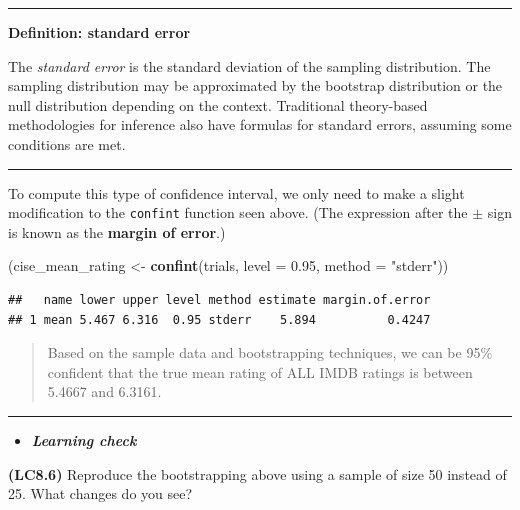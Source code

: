\documentclass[]{tufte-book}
\newenvironment{Shaded}{\begin{snugshade}}{\end{snugshade}}
\newcommand{\KeywordTok}[1]{\textcolor[rgb]{0.13,0.29,0.53}{\textbf{{#1}}}}
\newcommand{\DataTypeTok}[1]{\textcolor[rgb]{0.13,0.29,0.53}{{#1}}}
\newcommand{\FloatTok}[1]{\textcolor[rgb]{0.00,0.00,0.81}{{#1}}}
\newcommand{\StringTok}[1]{\textcolor[rgb]{0.31,0.60,0.02}{{#1}}}
\newcommand{\NormalTok}[1]{{#1}}
\let\oldrule=\rule
\renewcommand{\rule}[1]{\oldrule{\linewidth}}
\newenvironment{rmdblock}[1]
  {\begin{shaded*}
  \begin{itemize}
  \renewcommand{\labelitemi}{
    \raisebox{-.7\height}[0pt][0pt]{
    }
  }
  \item
  }
  {
  \end{itemize}
  \end{shaded*}
  }
\newenvironment{learncheck}
  {\begin{rmdblock}{warning}}
  {\end{rmdblock}}
\theoremstyle{definition}
\theoremstyle{definition}
\theoremstyle{remark}
\begin{document}
\begin{center}\rule{0.5\linewidth}{\linethickness}\end{center}

\textbf{Definition: standard error}

The \emph{standard error} is the standard deviation of the sampling
distribution. The sampling distribution may be approximated by the
bootstrap distribution or the null distribution depending on the
context. Traditional theory-based methodologies for inference also have
formulas for standard errors, assuming some conditions are met.

\begin{center}\rule{0.5\linewidth}{\linethickness}\end{center}

To compute this type of confidence interval, we only need to make a
slight modification to the \texttt{confint} function seen above. (The
expression after the \(\pm\) sign is known as the \textbf{margin of
error}.)

\begin{Shaded}
\begin{Highlighting}[]
\NormalTok{(cise_mean_rating <-}\StringTok{ }\KeywordTok{confint}\NormalTok{(trials, }\DataTypeTok{level =} \FloatTok{0.95}\NormalTok{, }\DataTypeTok{method =} \StringTok{"stderr"}\NormalTok{))}
\end{Highlighting}
\end{Shaded}

\begin{verbatim}
##   name lower upper level method estimate margin.of.error
## 1 mean 5.467 6.316  0.95 stderr    5.894          0.4247
\end{verbatim}

\begin{quote}
Based on the sample data and bootstrapping techniques, we can be 95\%
confident that the true mean rating of ALL IMDB ratings is between
5.4667 and 6.3161.
\end{quote}

\begin{center}\rule{0.5\linewidth}{\linethickness}\end{center}

\begin{learncheck}
\textbf{\emph{Learning check}}
\end{learncheck}

\textbf{(LC8.6)} Reproduce the bootstrapping above using a sample of
size 50 instead of 25. What changes do you see?
\end{document}
